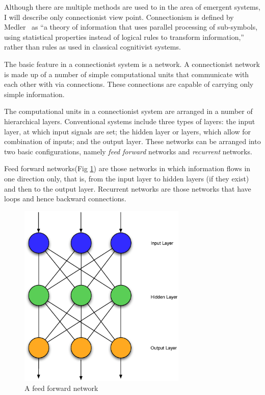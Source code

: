      Although there are multiple methods are used to in the area of
     emergent systems, I will describe only connectionist view
     point. Connectionism is defined by Medler~\cite{Medler98abrief}
     as ``a theory of information that uses parallel processing of
     sub-symbols, using statistical properties instead of logical
     rules to transform information,'' rather than rules as used in
     classical cognitivist systems.

     The basic feature in a connectionist system is a 
     network. A connectionist network is made up of a number of simple
     computational units that communicate with each other with via
     connections. These connections are capable of carrying only
     simple information.
     
     The computational units in a connectionist system are arranged in
     a number of hierarchical layers.  Conventional systems include
     three types of layers: the input layer, at which input signals
     are set; the hidden layer or layers, which allow for combination
     of inputs; and the output layer. These networks can be arranged
     into two basic configurations, namely \emph{feed forward}
     networks and \emph{recurrent} networks.

     Feed forward networks(Fig \ref{ASCA_AFFN}) are those networks in
     which information flows in one direction only, that is, from the
     input layer to hidden layers (if they exist) and then to the
     output layer. Recurrent networks are those networks that have
     loops and hence backward connections.

     \begin{figure}[htp]
     \centering
     \includegraphics[width=80mm]{FeedForwardNetwork}
     \caption{A feed forward network}
     \label{ASCA_AFFN}
     \end{figure}
     
